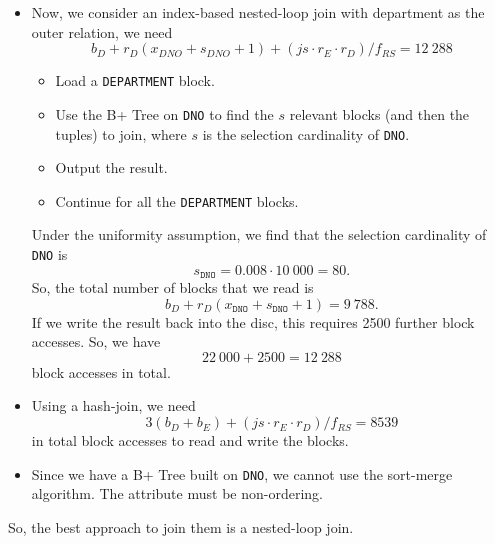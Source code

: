 \documentclass[a4paper, openany]{memoir}
\theoremstyle{definition}
\begin{document}
\begin{answer}
\begin{itemize}
        \item Now, we consider an index-based nested-loop join with department as the outer relation, we need
        \[b_D + r_D (x_{DNO} + s_{DNO} + 1) + (\textit{js} \cdot r_E \cdot r_D)/f_{RS} = 12 \ 288\]
        \begin{itemize}
            \item Load a \texttt{DEPARTMENT} block.
            \item Use the B+ Tree on \texttt{DNO} to find the $s$ relevant blocks (and then the tuples) to join, where $s$ is the selection cardinality of \texttt{DNO}.
            \item Output the result.
            \item Continue for all the \texttt{DEPARTMENT} blocks.
        \end{itemize}
        Under the uniformity assumption, we find that the selection cardinality of \texttt{DNO} is
        \[s_{\texttt{DNO}} = 0.008 \cdot 10 \ 000 = 80.\]
        So, the total number of blocks that we read is
        \[b_D + r_D (x_{\texttt{DNO}} + s_{\texttt{DNO}} + 1) = 9 \ 788.\]
        If we write the result back into the disc, this requires 2500 further block accesses. So, we have 
        \[22 \ 000 + 2500 = 12 \ 288\]
        block accesses in total.

        \item Using a hash-join, we need
        \[3(b_D + b_E) + (\textit{js} \cdot r_E \cdot r_D)/f_{RS} = 8539\]
        in total block accesses to read and write the blocks.

        \item Since we have a B+ Tree built on \texttt{DNO}, we cannot use the sort-merge algorithm. The attribute must be non-ordering.
    \end{itemize}
    So, the best approach to join them is a nested-loop join.
\end{answer}
\end{document}
